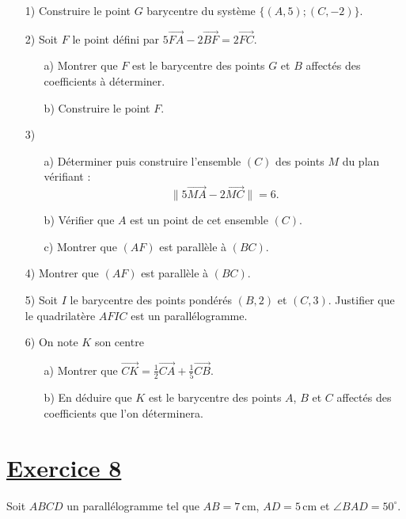 \documentclass[12pt]{article}
\begin{document}
\begin{enumerate}
    \item[1)] Construire le point \( G \) barycentre du système \( \{ (A, 5); (C, -2) \} \).
    
    \item[2)] Soit \( F \) le point défini par \( 5 \overrightarrow{FA} - 2 \overrightarrow{BF} = 2 \overrightarrow{FC} \).
    \begin{enumerate}
        \item[a)] Montrer que \( F \) est le barycentre des points \( G \) et \( B \) affectés des coefficients à déterminer.
        \item[b)] Construire le point \( F \).
    \end{enumerate}
    
    \item[3)] 
    \begin{enumerate}
        \item[a)] Déterminer puis construire l’ensemble \( (C) \) des points \( M \) du plan vérifiant :
        \[
        \| 5 \overrightarrow{MA} - 2 \overrightarrow{MC} \| = 6.
        \]
        \item[b)] Vérifier que \( A \) est un point de cet ensemble \( (C) \).
        \item[c)] Montrer que \( (AF) \) est parallèle à \( (BC) \).
    \end{enumerate}

    \item[4)] Montrer que \( (AF) \) est parallèle à \( (BC) \).
    
    \item[5)] Soit \( I \) le barycentre des points pondérés \( (B, 2) \) et \( (C, 3) \). Justifier que le quadrilatère \( AFIC \) est un parallélogramme.

    \item[6)] On note \( K \) son centre
    \begin{enumerate}
        \item[a)] Montrer que \( \overrightarrow{CK} = \frac{1}{2} \overrightarrow{CA} + \frac{1}{5} \overrightarrow{CB} \).
        \item[b)] En déduire que \( K \) est le barycentre des points \( A \), \( B \) et \( C \) affectés des coefficients que l’on déterminera.
    \end{enumerate}
\end{enumerate}

\section*{\underline{Exercice 8}}
Soit \( ABCD \) un parallélogramme tel que \( AB = 7 \, \text{cm} \), \( AD = 5 \, \text{cm} \) et \( \angle BAD = 50^\circ \).
\end{document}
